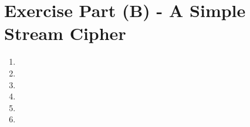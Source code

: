 \section*{Exercise Part (B) - A Simple Stream Cipher}

\begin{enumerate}[wide, label=(B\arabic*)]

\item

\item

\item

\item

\item

\item


\end{enumerate}